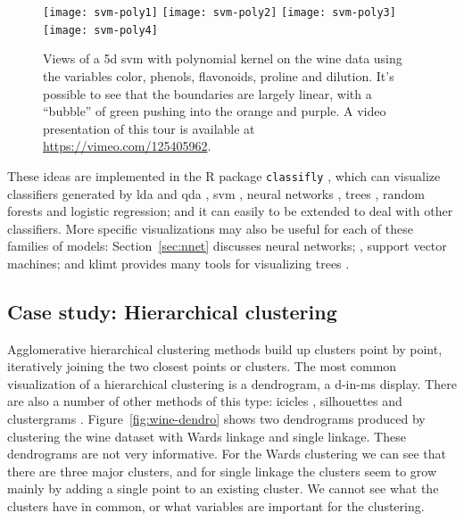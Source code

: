 \documentclass[preprint]{imsart}
\begin{document}
\begin{figure}[htbp]
  \centering
    \texttt{[image: svm-poly1]}
    \texttt{[image: svm-poly2]}
    \texttt{[image: svm-poly3]}
    \texttt{[image: svm-poly4]}
  \caption{Views of a 5d {\sc svm} with polynomial kernel on the wine data using the variables color, phenols, flavonoids, proline and dilution.  It's possible to see that the boundaries are largely linear, with a ``bubble'' of green pushing into the orange and purple.  A video presentation of this tour is available at \url{https://vimeo.com/125405962}.}
  \label{fig:svm-poly5}
\end{figure}

These ideas are implemented in the R package {\tt classifly} \citep{classifly}, which can visualize classifiers generated by {\sc lda} and {\sc qda} \citep{mass}, {\sc svm} \citep{e1071}, neural networks \citep{mass}, trees \citep{rpart}, random forests \citep{randomForest} and logistic regression; and it can easily to be extended to deal with other classifiers.  More specific visualizations may also be useful for each of these families of models: Section~\ref{sec:nnet} discusses neural networks; \citet{cook:2007}, support vector machines; and {\sc klimt} provides many tools for visualizing trees \citep{urbanek:2002,urbanek:2002a,urbanek:2003}.

\subsection{Case study: Hierarchical clustering}
\label{sub:hierarchical}

Agglomerative hierarchical clustering methods \citep{hartigan:1975a} build up clusters point by point, iteratively joining the two closest points or clusters. The most common visualization of a hierarchical clustering is a dendrogram, a d-in-ms display. There are also a number of other methods of this type: icicles \citep{kruskal:1983}, silhouettes \citep{trauwaert:1989} and clustergrams \citep{schonlau:2002}. Figure~\ref{fig:wine-dendro} shows two dendrograms produced by clustering the wine dataset with Wards linkage and single linkage. These dendrograms are not very informative. For the Wards clustering we can see that there are three major clusters, and for single linkage the clusters seem to grow mainly by adding a single point to an existing cluster. We cannot see what the clusters have in common, or what variables are important for the clustering.

\end{document}
